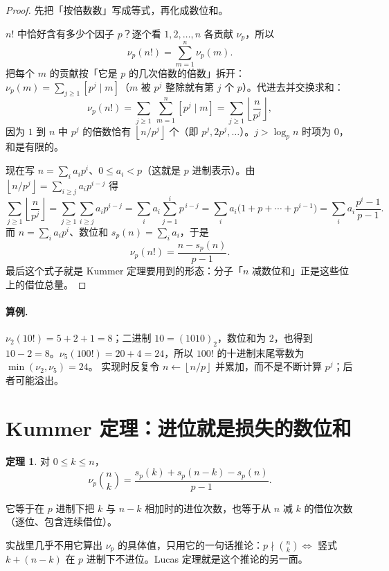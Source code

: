 \documentclass[UTF8,a4paper,11pt,oneside,openany,fontset=fandol]{ctexbook}
\theoremstyle{definition}
\newtheorem{theorem}[definition]{定理}
\newcommand{\floor}[1]{\left\lfloor #1\right\rfloor}
\newcommand{\iva}[1]{\left[#1\right]}
\begin{document}
\begin{proof}
先把「按倍数数」写成等式，再化成数位和。

$n!$ 中恰好含有多少个因子 $p$？逐个看 $1,2,\ldots,n$ 各贡献 $\nu_p$，所以
\[
 \nu_p(n!)=\sum_{m=1}^{n}\nu_p(m).
\]
把每个 $m$ 的贡献按「它是 $p$ 的几次倍数的倍数」拆开：$\nu_p(m)=\sum_{j\ge1}\iva{p^j\mid m}$（$m$ 被 $p^j$ 整除就有第 $j$ 个 $p$）。代进去并交换求和：
\[
 \nu_p(n!)=\sum_{j\ge1}\ \sum_{m=1}^{n}\iva{p^j\mid m}=\sum_{j\ge1}\floor{\frac{n}{p^j}},
\]
因为 $1$ 到 $n$ 中 $p^j$ 的倍数恰有 $\floor{n/p^j}$ 个（即 $p^j,2p^j,\ldots$）。$j>\log_p n$ 时项为 $0$，和是有限的。

现在写 $n=\sum_i a_ip^i$、$0\le a_i<p$（这就是 $p$ 进制表示）。由 $\floor{n/p^j}=\sum_{i\ge j}a_ip^{i-j}$ 得
\[
 \sum_{j\ge1}\floor{\frac{n}{p^j}}
 =\sum_{j\ge1}\sum_{i\ge j}a_ip^{i-j}
 =\sum_{i}a_i\sum_{j=1}^{i}p^{\,i-j}
 =\sum_i a_i\big(1+p+\cdots+p^{i-1}\big)
 =\sum_i a_i\frac{p^i-1}{p-1}.
\]
而 $n=\sum_i a_ip^i$、数位和 $s_p(n)=\sum_i a_i$，于是
\[
 \nu_p(n!)=\frac{n-s_p(n)}{p-1}.
\]
最后这个式子就是 Kummer 定理要用到的形态：分子「$n$ 减数位和」正是这些位上的借位总量。
\end{proof}

\paragraph{算例.} $\nu_2(10!)=5+2+1=8$；二进制 $10=(1010)_2$，数位和为 $2$，也得到 $10-2=8$。$\nu_5(100!)=20+4=24$，所以 $100!$ 的十进制末尾零数为 $\min(\nu_2,\nu_5)=24$。
实现时反复令 $n\gets\floor{n/p}$ 并累加，而不是不断计算 $p^j$；后者可能溢出。


\section{Kummer 定理：进位就是损失的数位和}
\begin{theorem}
对 $0\le k\le n$，
\[
\nu_p\binom nk=\frac{s_p(k)+s_p(n-k)-s_p(n)}{p-1}.
\]


它等于在 $p$ 进制下把 $k$ 与 $n-k$ 相加时的进位次数，也等于从 $n$ 减 $k$ 的借位次数（逐位、包含连续借位）。
\end{theorem}

\begin{tip}
实战里几乎不用它算出 $\nu_p$ 的具体值，只用它的一句话推论：$p\nmid\binom nk\iff$ 竖式 $k+(n-k)$ 在 $p$ 进制下不进位。Lucas 定理就是这个推论的另一面。
\end{tip}
\end{document}
